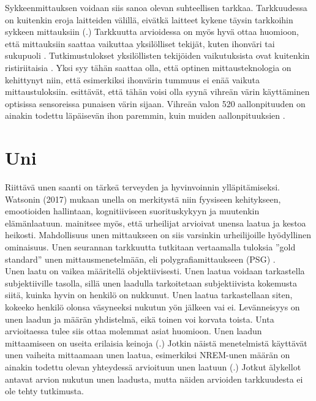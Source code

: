 \documentclass[utf8,bachelor,finnish]{bachelor}
\begin{document}
  
   Sykkeenmittauksen voidaan siis sanoa olevan suhteellisen tarkkaa.
    Tarkkuudessa on kuitenkin eroja laitteiden välillä, eivätkä laitteet kykene täysin tarkkoihin sykkeen mittauksiin
     (\cite{pasadyn_accuracy_2019,wang_accuracy_2017,nelson_accuracy_2019}.) Tarkkuutta arvioidessa on myös hyvä ottaa huomioon, että mittauksiin saattaa vaikuttaa
      yksilölliset tekijät, kuten ihonväri tai sukupuoli \parencite{shcherbina_accuracy_2017,hochstadt_continuous_2020}.
       Tutkimustulokset yksilöllisten tekijöiden vaikutuksista ovat kuitenkin ristiriitaisia \parencite{koerber_accuracy_2022, pasadyn_accuracy_2019}.
        Yksi syy tähän saattaa olla, että optinen mittausteknologia on kehittynyt niin, että esimerkiksi ihonvärin tummuus ei enää vaikuta mittaustuloksiin.
         \textcite{koerber_accuracy_2022} esittävät, että tähän voisi olla syynä vihreän värin käyttäminen optisissa sensoreissa punaisen värin sijaan.
          Vihreän valon 520 aallonpituuden on ainakin todettu läpäisevän ihon paremmin, kuin muiden aallonpituuksien \parencite{fallow_influence_2013}.
        
       

  \section{Uni}
  Riittävä unen saanti on tärkeä terveyden ja hyvinvoinnin ylläpitämiseksi. Watsonin (2017) mukaan unella on merkitystä niin fyysiseen kehitykseen,
   emootioiden hallintaan, kognitiiviseen suorituskykyyn ja muutenkin elämänlaatuun. 
    \textcite{watson_sleep_2017} mainitsee myös, että urheilijat arvioivat unensa laatua ja kestoa heikosti. Mahdollisuus unen mittaukseen
     on siis varsinkin urheilijoille hyödyllinen ominaisuus. Unen seurannan tarkkuutta tutkitaan vertaamalla tuloksia ''gold standard''
      unen mittausmenetelmään, eli polygrafiamittaukseen (PSG) \parencite{de_zambotti_measures_2016, rundo_chapter_2019, miller_validation_2022}.\\
  
  Unen laatu on vaikea määritellä objektiivisesti. Unen laatua voidaan tarkastella subjektiiville tasolla, sillä unen laadulla tarkoitetaan subjektiivista kokemusta siitä, kuinka hyvin on henkilö on nukkunut.
   Unen laatua tarkastellaan siten, kokeeko henkilö olonsa väsyneeksi nukutun yön jälkeen vai ei. Levänneisyys on
    unen laadun ja määrän yhdistelmä, eikä toinen voi korvata toista. Unta arvioitaessa tulee siis ottaa molemmat asiat huomioon.
     Unen laadun mittaamiseen on useita erilaisia keinoja (\cite{kohyama_which_2021}.)
      Jotkin näistä menetelmistä käyttävät unen vaiheita mittaamaan unen laatua, esimerkiksi
       NREM-unen määrän on ainakin todettu olevan yhteydessä arvioituun unen laatuun (\cite{krystal_measuring_2008}.)
        Jotkut älykellot antavat arvion nukutun unen laadusta, mutta näiden arvioiden tarkkuudesta ei ole tehty tutkimusta.\\
  
\end{document}
